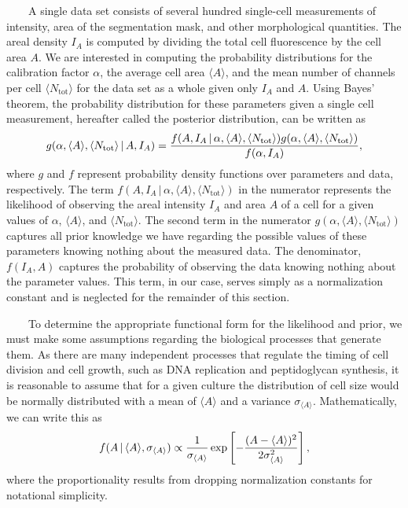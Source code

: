 ~~~~A
single
data
set
consists
of
several
hundred
single-cell
measurements
of
intensity,
area
of the
segmentation
mask,
and
other
morphological
quantities.
The
areal
density
\(I_A\)
is
computed
by
dividing
the
total
cell
fluorescence
by the
cell
area
\(A\).
We are
interested
in
computing
the
probability
distributions
for
the
calibration
factor
\(\alpha\),
the
average
cell
area
\(\langle A \rangle\),
and
the
mean
number
of
channels
per
cell
\(\langle N_\text{tot} \rangle\)
for
the
data
set as
a
whole
given
only
\(I_A\)
and
\(A\).
Using
Bayes'
theorem,
the
probability
distribution
for
these
parameters
given
a
single
cell
measurement,
hereafter
called
the
posterior
distribution,
can be
written
as
\begin{equation}
g(\alpha, \langle A \rangle, \langle N_\text{tot} \rangle\,\vert\, A, I_A) = {f(A, I_A\,\vert
\, \alpha,\langle A \rangle, \langle N_\text{tot} \rangle) g(\alpha,\langle A \rangle, \langle N_\text{tot} \rangle) \over f(\alpha, I_A)},
\label{eq:simple_bayes}\end{equation}
where
\(g\)
and
\(f\)
represent
probability
density
functions
over
parameters
and
data,
respectively.
The
term
\(f(A, I_A\,\vert\, \alpha, \langle A \rangle, \langle N_\text{tot} \rangle)\)
in the
numerator
represents
the
likelihood
of
observing
the
areal
intensity
\(I_A\)
and
area
\(A\)
of a
cell
for a
given
values
of
\(\alpha\),
\(\langle A \rangle\),
and
\(\langle N_\text{tot} \rangle\).
The
second
term
in the
numerator
\(g(\alpha,\langle A \rangle, \langle N_\text{tot} \rangle)\)
captures
all
prior
knowledge
we
have
regarding
the
possible
values
of
these
parameters
knowing
nothing
about
the
measured
data.
The
denominator,
\(f(I_A, A)\)
captures
the
probability
of
observing
the
data
knowing
nothing
about
the
parameter
values.
This
term,
in our
case,
serves
simply
as a
normalization
constant
and is
neglected
for
the
remainder
of
this
section.

~~~~To
determine
the
appropriate
functional
form
for
the
likelihood
and
prior,
we
must
make
some
assumptions
regarding
the
biological
processes
that
generate
them.
As
there
are
many
independent
processes
that
regulate
the
timing
of
cell
division
and
cell
growth,
such
as DNA
replication
and
peptidoglycan
synthesis,
it is
reasonable
to
assume
that
for a
given
culture
the
distribution
of
cell
size
would
be
normally
distributed
with a
mean
of
\(\langle A \rangle\)
and a
variance
\(\sigma_{\langle A \rangle}\).
Mathematically,
we can
write
this
as
\begin{equation}
f(A\,\vert\,\langle A \rangle, \sigma_{\langle A \rangle}) \propto {1 \over \sigma_{\langle A \rangle}}\exp\left[-{(A - \langle A \rangle)^2 \over 2\sigma_{\langle A \rangle}^2}\right],
\label{eq:area_likelihood}\end{equation}
where
the
proportionality
results
from
dropping
normalization
constants
for
notational
simplicity.

